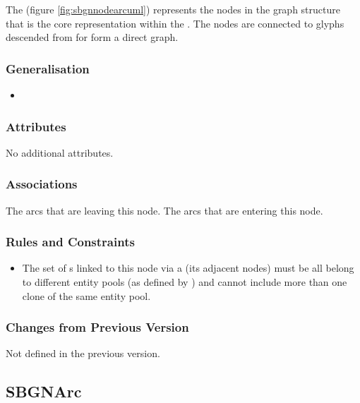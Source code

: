 The  (figure \ref{fig:sbgnnodearcuml}) represents
the nodes in the graph structure that is the core representation
within the \PDl. The nodes are connected to glyphs descended from
 for form a direct graph.

\subsubsection{Generalisation}

\begin{itemize}
\item {}
\end{itemize}

\subsubsection{Attributes}

No additional attributes.

\subsubsection{Associations}

\begin{attributes}
   The arcs that are leaving this node.
   The arcs that are entering this node.
\end{attributes}
 
\subsubsection{Rules and Constraints}

\begin{itemize}
\item The set of s linked to this node via a
   (its adjacent nodes) must be all belong to
  different entity pools (as defined by )
  and cannot include more than one clone of the same entity pool. 
\end{itemize}

\subsubsection{Changes from Previous Version}

Not defined in the previous version.

\subsection{SBGNArc}
\label{defn:SBGNArc}

